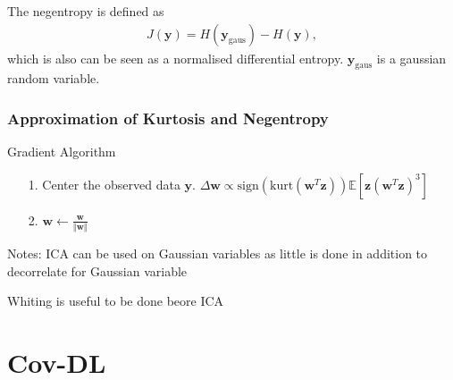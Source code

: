 The negentropy is defined as 
\begin{align*}
J(\mathbf{y}) = H(\mathbf{y}_{\text{gaus}}) - H(\mathbf{y}),
\end{align*}
which is also can be seen as a normalised differential entropy. $\mathbf{y}_{\text{gaus}}$ is a gaussian random variable.

\subsubsection{Approximation of Kurtosis and Negentropy}


\begin{algorithm}[H]
\caption{Gradient Algorithm}
\begin{itemize}
\item[1.] Center the observed data $\mathbf{y}$. $\Delta \mathbf{w} \propto \text{sign}(\text{kurt}(\mathbf{w}^T \mathbf{z})) \mathbb{E}[\mathbf{z} (\mathbf{w}^T \mathbf{z})^3 ]$
\item[2.] $\mathbf{w} \leftarrow \frac{\mathbf{w}}{\Vert \mathbf{w} \Vert}$
\end{itemize}
\end{algorithm}









Notes:
ICA can be used on Gaussian variables as little is done in addition to decorrelate for Gaussian variable

Whiting is useful to be done beore ICA

\section{Cov-DL}